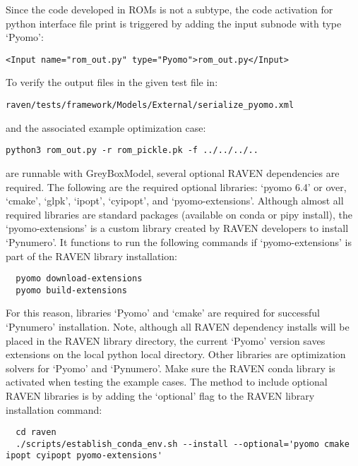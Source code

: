 Since the code developed in ROMs is not a subtype, the code activation for python interface file print is triggered by adding the input subnode with type `Pyomo':

\begin{lstlisting}[style=XML,morekeywords={name,subType}]
  <Input name="rom_out.py" type="Pyomo">rom_out.py</Input>
\end{lstlisting}

To verify the output files in the given test file in:

\begin{lstlisting}[style=XML,morekeywords={name,subType}]
  raven/tests/framework/Models/External/serialize_pyomo.xml
\end{lstlisting}

and the associated example optimization case:

\begin{lstlisting}[style=XML,morekeywords={name,subType}]
  python3 rom_out.py -r rom_pickle.pk -f ../../../..
\end{lstlisting}

are runnable with GreyBoxModel, several optional RAVEN dependencies are required. The following are the required
optional libraries: `pyomo 6.4' or over, `cmake', `glpk', `ipopt', `cyipopt', and `pyomo-extensions'. Although almost all required
libraries are standard packages (available on conda or pipy install), the `pyomo-extensions' is a custom library created by RAVEN developers to install `Pynumero'.
It functions to run the following commands if `pyomo-extensions' is part of the RAVEN library installation:

\begin{lstlisting}
  pyomo download-extensions
  pyomo build-extensions
\end{lstlisting}

For this reason, libraries `Pyomo' and `cmake' are required for successful `Pynumero' installation. Note, although all RAVEN dependency installs will
be placed in the RAVEN library directory, the current `Pyomo' version saves extensions on the local python local directory.
Other libraries are optimization solvers for `Pyomo' and `Pynumero'. Make sure the RAVEN conda library is activated when testing the example cases.
The method to include optional RAVEN libraries is by adding the `optional' flag to the RAVEN library installation command:

\begin{lstlisting}
  cd raven
  ./scripts/establish_conda_env.sh --install --optional='pyomo cmake ipopt cyipopt pyomo-extensions'
\end{lstlisting}

